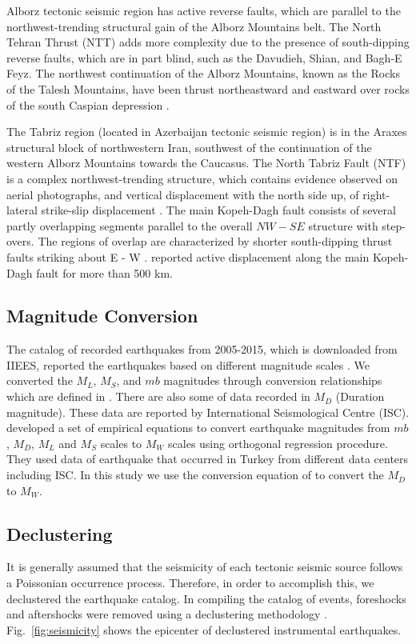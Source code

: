 \noindent
Alborz tectonic seismic region has active reverse faults, which are parallel to the northwest-trending structural gain of the Alborz Mountains belt. The North Tehran Thrust (NTT) adds more complexity due to the presence of south-dipping reverse faults, which are in part blind, such as the Davudieh, Shian, and Bagh-E Feyz.
The northwest continuation of the Alborz Mountains, known as the Rocks of the Talesh Mountains, have been thrust northeastward and eastward over rocks of the south Caspian depression \citep{Berberian1999}. 

\noindent
 The Tabriz region (located in Azerbaijan tectonic seismic region) is in the Araxes structural block of northwestern Iran, southwest of the continuation of the western Alborz Mountains towards the Caucasus. The North Tabriz Fault (NTF) is a complex northwest-trending structure, which contains evidence observed on aerial photographs, and vertical displacement with the north side up, of right-lateral strike-slip displacement \citep{Berberian1999}.
\noindent
The main Kopeh-Dagh fault consists of several partly overlapping segments parallel to the overall $NW - SE$ structure with step-overs. The regions of overlap are characterized by shorter south-dipping thrust faults striking about E - W \citep{Berberian2001}. \citet{Trifonov1978} reported active displacement along the main Kopeh-Dagh fault for more than 500 km. 

\subsection{Magnitude Conversion}
\noindent
The catalog of recorded earthquakes from 2005-2015, which is downloaded from IIEES, reported the earthquakes based on different magnitude scales \citep{IIEES}. We converted the $M_L$, $M_S$, and $mb$ magnitudes through conversion relationships which are defined in \citet{Zare2014}. There are also some of data recorded in $M_D$ (Duration magnitude). These data are reported by International Seismological Centre (ISC).  \citet{Deniz2010} developed a set of empirical equations to convert earthquake magnitudes from $mb$, $M_D$, $M_L$ and $M_S$ scales to $M_W$ scales using orthogonal regression procedure. They used data of earthquake that occurred in Turkey from different data centers including ISC. In this study we use the conversion equation of \citet{Deniz2010} to convert the $M_D$ to $M_W$. 

\subsection{Declustering}
\noindent
It is generally assumed that the seismicity of each tectonic seismic source follows a Poissonian occurrence process. Therefore, in order to accomplish this, we declustered the earthquake catalog. In compiling the catalog of events, foreshocks and aftershocks were removed using a declustering methodology \citet{Gardner1974}. Fig.~\ref{fig:seismicity} shows the epicenter of declustered instrumental  earthquakes.

